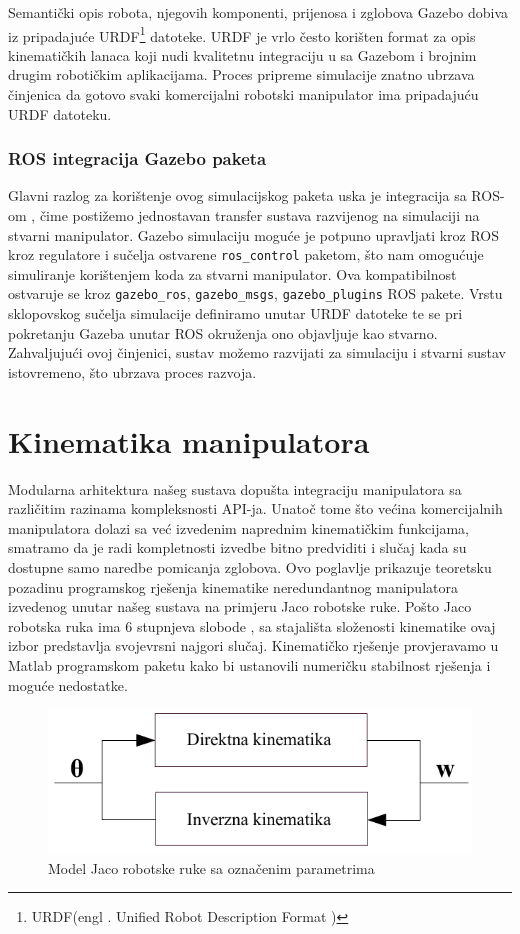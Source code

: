 \documentclass[times, utf8, diplomski, numeric]{fer}
\begin{document}
Semantički opis robota, njegovih komponenti, prijenosa i zglobova Gazebo dobiva iz pripadajuće URDF\footnote{URDF(engl . Unified Robot Description Format )} datoteke.
URDF je vrlo često korišten format za opis kinematičkih lanaca koji nudi kvalitetnu integraciju u sa Gazebom i brojnim drugim robotičkim aplikacijama.
Proces pripreme simulacije znatno ubrzava činjenica da gotovo svaki komercijalni robotski manipulator ima pripadajuću URDF datoteku.

\subsection{ROS integracija Gazebo paketa}
Glavni razlog za korištenje ovog simulacijskog paketa uska je integracija sa ROS-om , čime postižemo jednostavan transfer sustava razvijenog na simulaciji na stvarni manipulator.
Gazebo simulaciju moguće je potpuno upravljati kroz ROS kroz regulatore i sučelja ostvarene \texttt{ros\_control} paketom, što nam omogućuje simuliranje korištenjem koda za stvarni manipulator.
Ova kompatibilnost ostvaruje se kroz \texttt{gazebo\_ros}, \texttt{gazebo\_msgs}, \texttt{gazebo\_plugins}  ROS pakete.
Vrstu sklopovskog sučelja simulacije definiramo unutar URDF datoteke te se pri pokretanju Gazeba unutar ROS okruženja ono objavljuje kao stvarno.
Zahvaljujući ovoj činjenici, sustav možemo razvijati za simulaciju i stvarni sustav istovremeno, što ubrzava proces razvoja.





\chapter{Kinematika manipulatora}
Modularna arhitektura našeg sustava dopušta integraciju manipulatora sa različitim razinama kompleksnosti API-ja.
Unatoč tome što većina komercijalnih manipulatora dolazi sa već izvedenim naprednim kinematičkim funkcijama, smatramo da je radi kompletnosti izvedbe bitno predviditi i slučaj kada su dostupne samo naredbe pomicanja zglobova.
Ovo poglavlje prikazuje teoretsku pozadinu programskog rješenja kinematike neredundantnog manipulatora izvedenog unutar našeg sustava na primjeru Jaco robotske ruke.
Pošto Jaco robotska ruka ima 6 stupnjeva slobode , sa stajališta složenosti kinematike ovaj izbor predstavlja svojevrsni najgori slučaj.
Kinematičko rješenje provjeravamo u Matlab programskom paketu kako bi ustanovili numeričku stabilnost rješenja i moguće nedostatke.

\begin{figure}[h!]
\centering
\includegraphics[scale=0.8]{kinematika}
\caption{Model Jaco robotske ruke sa označenim parametrima} \label{h}
\end{figure}
\end{document}
